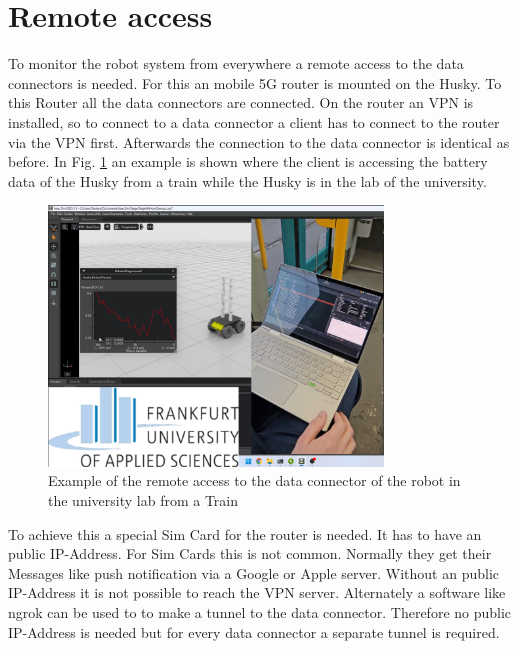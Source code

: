 \documentclass[conference]{IEEEtran}
\begin{document}
\section{Remote access}
To monitor the robot system from everywhere a remote access to the data connectors is needed.
For this an mobile 5G router is mounted on the Husky. To this Router all the data connectors are connected.
On the router an VPN is installed, so to connect to a data connector a client has to connect to the router via the VPN first.
Afterwards the connection to the data connector is identical as before.
In Fig. \ref{fig:RemoteAccess} an example is shown where the client is accessing the battery data of the Husky from a train while the Husky is in the lab of the university.\\

\begin{figure}[htbp]
    \centerline{\includegraphics[width=8.9cm]{Pictures/ZugZugriff.png}}
    \caption{Example of the remote access to the data connector of the robot in the university lab from a Train}
    \label{fig:RemoteAccess}
\end{figure}
To achieve this a special Sim Card for the router is needed.
It has to have an public IP-Address. For Sim Cards this is not common.
Normally they get their Messages like push notification via a Google or Apple server.
Without an public IP-Address it is not possible to reach the VPN server.
Alternately a software like ngrok can be used to to make a tunnel to the data connector. Therefore no public IP-Address is needed but for every data connector a separate tunnel is required.
\end{document}
